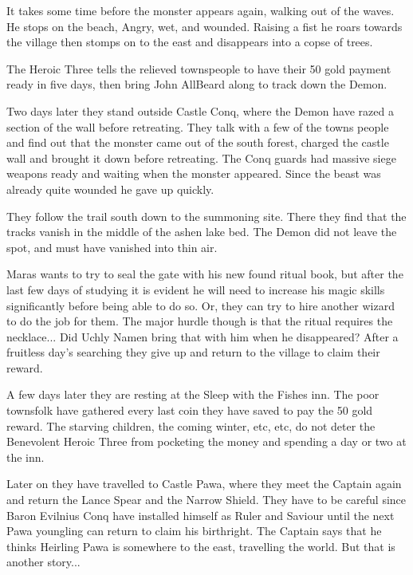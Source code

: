 It takes some time before the monster appears again, walking out of the waves. He stops on the beach, Angry, wet, and wounded. Raising a fist he roars towards the village then stomps on to the east and disappears into a copse of trees.

The Heroic Three tells the relieved townspeople to have their 50 gold payment ready in five days, then bring John AllBeard along to track down the Demon.

Two days later they stand outside Castle Conq, where the Demon have razed a section of the wall before retreating. They talk with a few of the towns people and find out that the monster came out of the south forest, charged the castle wall and brought it down before retreating. The Conq guards had massive siege weapons ready and waiting when the monster appeared. Since the beast was already quite wounded he gave up quickly.

They follow the trail south down to the summoning site. There they find that the tracks vanish in the middle of the ashen lake bed. The Demon did not leave the spot, and must have vanished into thin air.

Maras wants to try to seal the gate with his new found ritual book, but after the last few days of studying it is evident he will need to increase his magic skills significantly before being able to do so. Or, they can try to hire another wizard to do the job for them. The major hurdle though is that the ritual requires the necklace... Did Uchly Namen bring that with him when he disappeared? After a fruitless day's searching they give up and return to the village to claim their reward.

A few days later they are resting at the Sleep with the Fishes inn. The poor townsfolk have gathered every last coin they have saved to pay the 50 gold reward. The starving children, the coming winter, etc, etc, do not deter the Benevolent Heroic Three from pocketing the money and spending a day or two at the inn.

Later on they have travelled to Castle Pawa, where they meet the Captain again and return the Lance Spear and the Narrow Shield. They have to be careful since Baron Evilnius Conq have installed himself as Ruler and Saviour until the next Pawa youngling can return to claim his birthright. The Captain says that he thinks Heirling Pawa is somewhere to the east, travelling the world. But that is another story...

\



